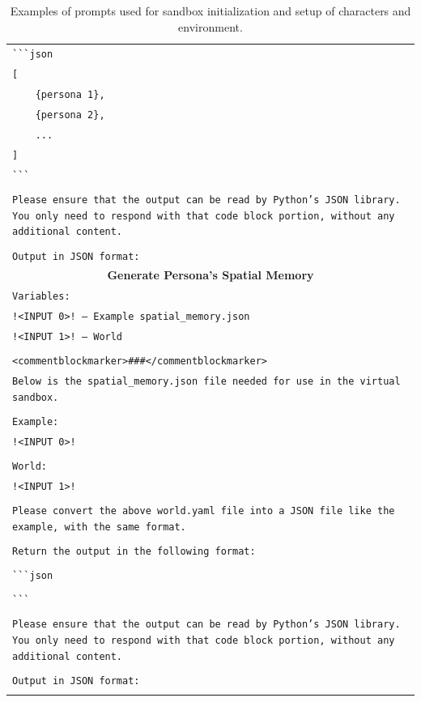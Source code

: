 \documentclass[letterpaper]{article} %
\begin{document}
\begin{small}
\begin{longtable}{p{\textwidth}}
    \\
    \verb|```|\texttt{json} \\
    \texttt{[} \\
    \texttt{\ \ \ \ \{persona 1\},} \\
    \texttt{\ \ \ \ \{persona 2\},} \\
    \texttt{\ \ \ \ ...} \\
    \texttt{]} \\
    \verb|```| \\
    \\
    \texttt{Please ensure that the output can be read by Python's JSON library. You only need to respond with that code block portion, without any additional content.} \\
    \\
    \texttt{Output in JSON format:} \\
    \midrule

    \multicolumn{1}{c}{\textbf{Generate Persona's Spatial Memory}} \\
    \midrule

    \texttt{Variables:} \\
    \texttt{!<INPUT 0>! -- Example spatial\_memory.json} \\
    \texttt{!<INPUT 1>! -- World} \\
    \\
    \texttt{<commentblockmarker>\#\#\#</commentblockmarker>} \\
    \texttt{Below is the spatial\_memory.json file needed for use in the virtual sandbox.} \\
    \\
    \texttt{Example:} \\
    \texttt{!<INPUT 0>!} \\
    \\
    \texttt{World:} \\
    \texttt{!<INPUT 1>!} \\
    \\
    \texttt{Please convert the above world.yaml file into a JSON file like the example, with the same format.} \\
    \\
    \texttt{Return the output in the following format:} \\
    \\
    \verb|```|\texttt{json} \\
    \\
    \verb|```| \\
    \\
    \texttt{Please ensure that the output can be read by Python's JSON library. You only need to respond with that code block portion, without any additional content.} \\
    \\
    \texttt{Output in JSON format:} \\

    \bottomrule

    \caption{Examples of prompts used for sandbox initialization and setup of characters and environment.}
    \label{tab:prompts_example}
  \end{longtable}
\end{small}
\end{document}
